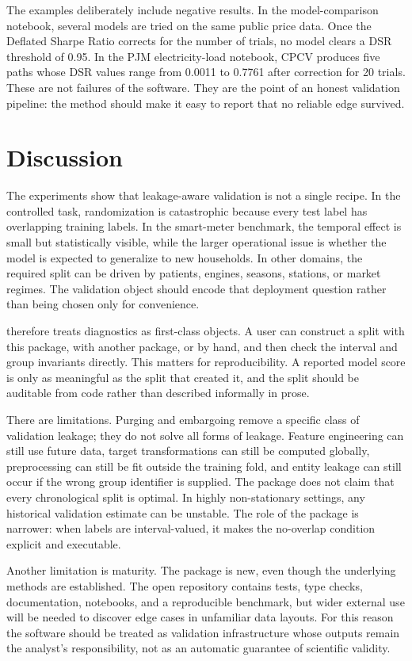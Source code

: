 \documentclass[article]{jdssv}
\newcommand{\pcv}{\pkg{purgedcv}}
\begin{document}
The examples deliberately include negative results. In the model-comparison
notebook, several models are tried on the same public price data. Once the
Deflated Sharpe Ratio corrects for the number of trials, no model clears a DSR
threshold of 0.95. In the PJM electricity-load notebook, CPCV produces five
paths whose DSR values range from 0.0011 to 0.7761 after correction for 20
trials. These are not failures of the software. They are the point of an honest
validation pipeline: the method should make it easy to report that no reliable
edge survived.

\section{Discussion}

The experiments show that leakage-aware validation is not a single recipe. In
the controlled task, randomization is catastrophic because every test label has
overlapping training labels. In the smart-meter benchmark, the temporal effect
is small but statistically visible, while the larger operational issue is
whether the model is expected to generalize to new households. In other domains,
the required split can be driven by patients, engines, seasons, stations, or
market regimes. The validation object should encode that deployment question
rather than being chosen only for convenience.

\pcv{} therefore treats diagnostics as first-class objects. A user can
construct a split with this package, with another package, or by hand, and then
check the interval and group invariants directly. This matters for
reproducibility. A reported model score is only as meaningful as the split that
created it, and the split should be auditable from code rather than described
informally in prose.

There are limitations. Purging and embargoing remove a specific class of
validation leakage; they do not solve all forms of leakage. Feature engineering
can still use future data, target transformations can still be computed
globally, preprocessing can still be fit outside the training fold, and entity
leakage can still occur if the wrong group identifier is supplied. The package
does not claim that every chronological split is optimal. In highly
non-stationary settings, any historical validation estimate can be unstable. The
role of the package is narrower: when labels are interval-valued, it makes the
no-overlap condition explicit and executable.

Another limitation is maturity. The package is new, even though the underlying
methods are established. The open repository contains tests, type checks,
documentation, notebooks, and a reproducible benchmark, but wider external use
will be needed to discover edge cases in unfamiliar data layouts. For this
reason the software should be treated as validation infrastructure whose outputs
remain the analyst's responsibility, not as an automatic guarantee of scientific
validity.
\end{document}
